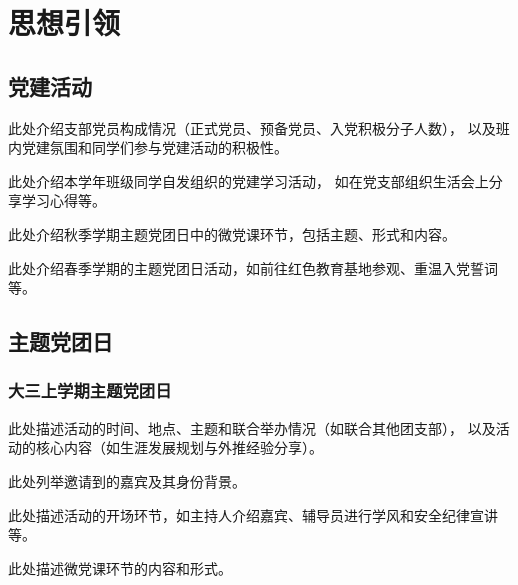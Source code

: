 \section{思想引领}

\subsection{党建活动}

此处介绍支部党员构成情况（正式党员、预备党员、入党积极分子人数），
以及班内党建氛围和同学们参与党建活动的积极性。

此处介绍本学年班级同学自发组织的党建学习活动，
如在党支部组织生活会上分享学习心得等。


此处介绍秋季学期主题党团日中的微党课环节，包括主题、形式和内容。

此处介绍春季学期的主题党团日活动，如前往红色教育基地参观、重温入党誓词等。

\subsection{主题党团日}

\subsubsection{大三上学期主题党团日}

此处描述活动的时间、地点、主题和联合举办情况（如联合其他团支部），
以及活动的核心内容（如生涯发展规划与外推经验分享）。

此处列举邀请到的嘉宾及其身份背景。

此处描述活动的开场环节，如主持人介绍嘉宾、辅导员进行学风和安全纪律宣讲等。


此处描述微党课环节的内容和形式。


